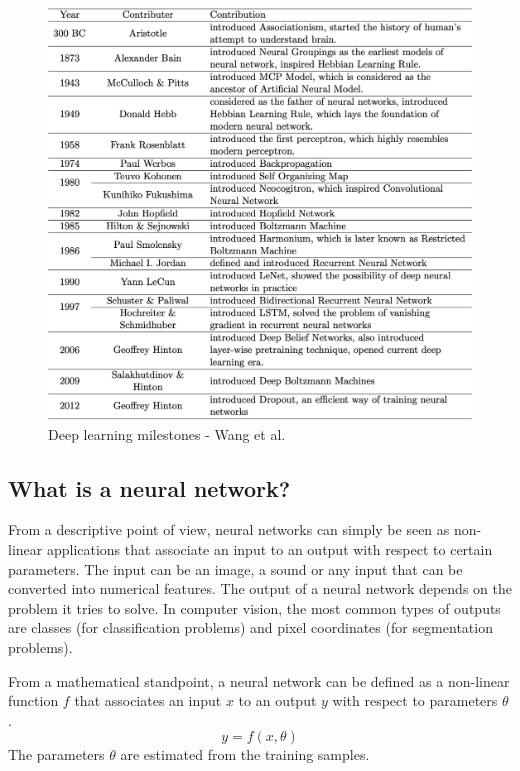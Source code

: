 \begin{figure}[!h]
\centering
\includegraphics[width=1\textwidth, keepaspectratio=true]{./figures/history.png}
\caption{Deep learning milestones - Wang et al. \cite{14}}
\label{history}
\end{figure}

 
\subsection{What is a neural network?}
\label{what_is_a_neural_network}
\setlength{\marginparwidth}{3cm}\leavevmode {}From a descriptive point of view, neural networks can simply be seen as non-linear applications that associate an input to an output with respect to certain parameters. The input can be an image, a sound or any input that can be converted into numerical features. The output of a neural network depends on the problem it tries to solve. In computer vision, the most common types of outputs are classes (for classification problems) and pixel coordinates (for segmentation problems).

From a mathematical standpoint, a neural network can be defined as a non-linear function $f$ that associates an input $x$ to an output $y$ with respect to parameters $\theta$.
\begin{equation}
y = f(x,\theta)
\end{equation}
The parameters $\theta$ are estimated from the training samples.

